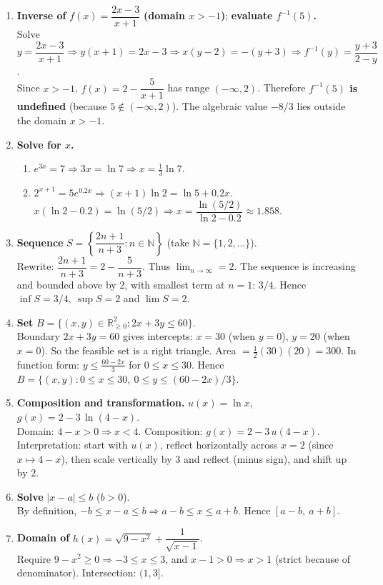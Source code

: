 \documentclass[12pt]{article}
\newcommand{\R}{\mathbb{R}}
\begin{document}
\begin{enumerate}
\item \textbf{Inverse of} $f(x)=\dfrac{2x-3}{x+1}$ \textbf{(domain $x>-1$)}; \textbf{evaluate $f^{-1}(5)$.}\\
Solve $y=\dfrac{2x-3}{x+1}\Rightarrow y(x+1)=2x-3\Rightarrow x(y-2)=-(y+3)\Rightarrow \boxed{f^{-1}(y)=\dfrac{y+3}{2-y}}$.\\
Since $x>-1$, $f(x)=2-\dfrac{5}{x+1}$ has range $(-\infty,2)$. Therefore \textbf{$f^{-1}(5)$ is undefined} (because $5\notin(-\infty,2)$). The algebraic value $-8/3$ lies outside the domain $x>-1$.

\item \textbf{Solve for $x$.}
\begin{enumerate}[label=(\alph*)]
  \item $e^{3x}=7\Rightarrow 3x=\ln 7\Rightarrow \boxed{x=\tfrac{1}{3}\ln 7}$.
  \item $2^{x+1}=5e^{0.2x}\Rightarrow (x+1)\ln 2=\ln 5+0.2x$.\\
  $x(\ln 2-0.2)=\ln(5/2)\Rightarrow \boxed{x=\dfrac{\ln(5/2)}{\ln 2-0.2}}\approx \boxed{1.858}$.
\end{enumerate}

\item \textbf{Sequence} $S=\left\{\dfrac{2n+1}{n+3}:n\in\mathbb{N}\right\}$ (take $\mathbb{N}=\{1,2,\dots\}$).\\
Rewrite: $\dfrac{2n+1}{n+3}=2-\dfrac{5}{n+3}$. Thus $\lim_{n\to\infty}=2$. The sequence is increasing and bounded above by $2$, with smallest term at $n=1$: $3/4$. Hence $\boxed{\inf S=3/4,\ \sup S=2}$ and $\boxed{\lim S=2}$.

\item \textbf{Set} $B=\{(x,y)\in\R_{\ge0}^2:2x+3y\le 60\}$.\\
Boundary $2x+3y=60$ gives intercepts: $x=30$ (when $y=0$), $y=20$ (when $x=0$). So the feasible set is a right triangle. Area $=\tfrac12(30)(20)=\boxed{300}$. In function form: $y\le \frac{60-2x}{3}$ for $0\le x\le 30$. Hence $\boxed{B=\{(x,y):0\le x\le 30,\ 0\le y\le (60-2x)/3\}}$.

\item \textbf{Composition and transformation.} $u(x)=\ln x$, $g(x)=2-3\,\ln(4-x)$.\\
Domain: $4-x>0\Rightarrow \boxed{x<4}$. Composition: $\boxed{g(x)=2-3\,u(4-x)}$. Interpretation: start with $u(x)$, reflect horizontally across $x=2$ (since $x\mapsto 4-x$), then scale vertically by $3$ and reflect (minus sign), and shift up by $2$.

\item \textbf{Solve} $|x-a|\le b$ ($b>0$).\\
By definition, $-b\le x-a\le b\Rightarrow a-b\le x\le a+b$. Hence $\boxed{[a-b,\ a+b]}$.

\item \textbf{Domain of} $h(x)=\sqrt{9-x^2}+\dfrac{1}{\sqrt{x-1}}$.\\
Require $9-x^2\ge 0\Rightarrow -3\le x\le 3$, and $x-1>0\Rightarrow x>1$ (strict because of denominator). Intersection: $\boxed{(1,3]}$.
\end{enumerate}
\newpage
\end{document}
